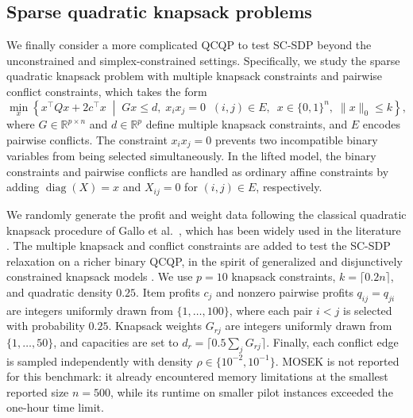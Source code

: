 \documentclass[11pt]{article}
\DeclareMathOperator{\diag}{diag}
\def\R{\mathbb{R}}
\theoremstyle{plain}
\begin{document}
\subsection{Sparse quadratic knapsack problems}
\label{subsec:numexp-sqkp-conflict}

We finally consider a more complicated QCQP to test SC-SDP beyond the unconstrained and simplex-constrained settings. Specifically, we study the sparse quadratic knapsack problem with multiple knapsack constraints and pairwise conflict constraints, which takes the form
\begingroup
\renewcommand{\theequation}{S-QKP}
\begin{equation}\label{eq:sqkp-conflict-model}
\min_{x}
\left\{
x^\top Qx + 2c^\top x
\;\middle|\;
Gx\le d,\;
x_i x_j=0\;\; (i,j)\in E,\;
\ x\in\{0,1\}^n,\;
\|x\|_0\le k
\right\},
\tag{S-QKP}
\end{equation}
\endgroup
where $G\in\R^{p\times n}$ and $d\in\R^p$ define multiple knapsack constraints, and $E$ encodes pairwise conflicts. The constraint $x_i x_j=0$ prevents two incompatible binary variables from being selected simultaneously. 
In the lifted model, the binary constraints and pairwise conflicts are handled as ordinary affine constraints by adding \(\diag(X)=x\) and \(X_{ij}=0\) for \((i,j)\in E\), respectively.

We randomly generate the profit and weight data following the classical
quadratic knapsack procedure of Gallo et al.~\cite{gallo1980quadratic}, which
has been widely used in the literature
\cite{billionnet2004exact,caprara1999exact,pisinger2007quadratic,tang2024feasible}.
The multiple knapsack and conflict constraints are added to test the SC-SDP
relaxation on a richer binary QCQP, in the spirit of generalized and
disjunctively constrained knapsack models
\cite{saracc2014generalized,yamada2002heuristic}. We use \(p=10\) knapsack
constraints, \(k=\lceil 0.2n\rceil\), and quadratic density \(0.25\). Item
profits \(c_j\) and nonzero pairwise profits \(q_{ij}=q_{ji}\) are integers
uniformly drawn from \(\{1,\ldots,100\}\), where each pair \(i<j\) is selected
with probability \(0.25\). Knapsack weights \(G_{rj}\) are integers uniformly
drawn from \(\{1,\ldots,50\}\), and capacities are set to
\(d_r=\lceil 0.5\sum_j G_{rj}\rceil\). Finally, each conflict edge is sampled independently with
density \(\rho\in\{10^{-2},10^{-1}\}\). MOSEK is not reported for this
benchmark: it already encountered memory limitations at the smallest
reported size \(n=500\), while its runtime on smaller pilot instances
exceeded the one-hour time limit. 
\end{document}
